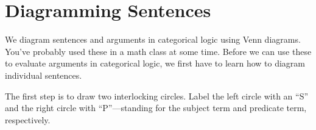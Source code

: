 \documentclass[../logic-text.tex]{subfiles}
\begin{document}
\medskip
{}

\section{Diagramming Sentences}
\label{sec:diagramming-sentences}



We diagram sentences and arguments in categorical logic using Venn diagrams. You've probably used these in a math class at some time. Before we can use these to evaluate arguments in categorical logic, we first have to learn how to diagram individual sentences.

The first step is to draw two interlocking circles. Label the left circle with an \enquote{S} and the right circle with \enquote{P}---standing for the subject term and predicate term, respectively.

\def\sub{(0,0) circle (1.5cm)}
\def\mid{(-60:2cm) circle (1.5cm)}
\def\pred{(0:2cm) circle (1.5cm)}
\end{document}
